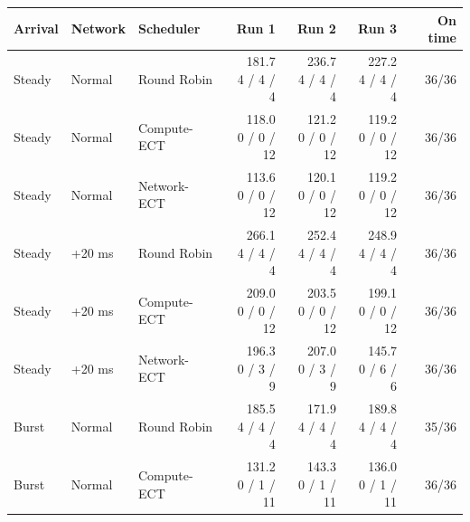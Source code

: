 \begin{table}[H]
\centering
\label{table:scenario-summary:start}
\begin{tabular}{lllrrrr}
\toprule
\textbf{Arrival} & \textbf{Network} & \textbf{Scheduler} & \textbf{Run 1} & \textbf{Run 2} & \textbf{Run 3} & \textbf{On time} \\
\midrule
Steady & Normal & Round Robin & \shortstack[r]{181.7\\4 / 4 / 4} & \shortstack[r]{236.7\\4 / 4 / 4} & \shortstack[r]{227.2\\4 / 4 / 4} & 36/36 \\
Steady & Normal & Compute-ECT & \shortstack[r]{118.0\\0 / 0 / 12} & \shortstack[r]{121.2\\0 / 0 / 12} & \shortstack[r]{119.2\\0 / 0 / 12} & 36/36 \\
Steady & Normal & Network-ECT & \shortstack[r]{113.6\\0 / 0 / 12} & \shortstack[r]{120.1\\0 / 0 / 12} & \shortstack[r]{119.2\\0 / 0 / 12} & 36/36 \\
Steady & +20 ms & Round Robin & \shortstack[r]{266.1\\4 / 4 / 4} & \shortstack[r]{252.4\\4 / 4 / 4} & \shortstack[r]{248.9\\4 / 4 / 4} & 36/36 \\
Steady & +20 ms & Compute-ECT & \shortstack[r]{209.0\\0 / 0 / 12} & \shortstack[r]{203.5\\0 / 0 / 12} & \shortstack[r]{199.1\\0 / 0 / 12} & 36/36 \\
Steady & +20 ms & Network-ECT & \shortstack[r]{196.3\\0 / 3 / 9} & \shortstack[r]{207.0\\0 / 3 / 9} & \shortstack[r]{145.7\\0 / 6 / 6} & 36/36 \\
Burst & Normal & Round Robin & \shortstack[r]{185.5\\4 / 4 / 4} & \shortstack[r]{171.9\\4 / 4 / 4} & \shortstack[r]{189.8\\4 / 4 / 4} & 35/36 \\
Burst & Normal & Compute-ECT & \shortstack[r]{131.2\\0 / 1 / 11} & \shortstack[r]{143.3\\0 / 1 / 11} & \shortstack[r]{136.0\\0 / 1 / 11} & 36/36 \\

\end{tabular}
\end{table}
